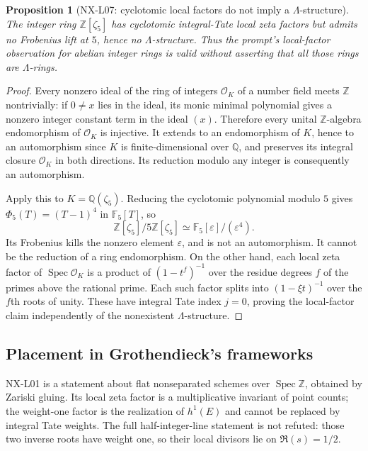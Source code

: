 \documentclass[11pt]{article}
\newtheorem{proposition}[theorem]{Proposition}
\theoremstyle{remark}
\begin{document}
\begin{proposition}[NX-L07: cyclotomic local factors do not imply a $\Lambda$-structure]
\label{NX-L07}
The integer ring $\mathbb Z[\zeta_5]$ has cyclotomic integral-Tate
local zeta factors but admits no Frobenius lift at $5$, hence no
$\Lambda$-structure.  Thus the prompt's local-factor observation for
abelian integer rings is valid without asserting that all those
rings are $\Lambda$-rings.
\end{proposition}

\begin{proof}
Every nonzero ideal of the ring of integers $\mathcal O_K$ of a
number field meets $\mathbb Z$ nontrivially: if $0\ne x$ lies in the
ideal, its monic minimal polynomial gives a nonzero integer constant
term in the ideal $(x)$.  Therefore every unital $\mathbb Z$-algebra
endomorphism of $\mathcal O_K$ is injective.  It extends to an
endomorphism of $K$, hence to an automorphism since $K$ is
finite-dimensional over $\mathbb Q$, and preserves its integral
closure $\mathcal O_K$ in both directions.  Its reduction modulo
any integer is consequently an automorphism.

Apply this to $K=\mathbb Q(\zeta_5)$.  Reducing the cyclotomic
polynomial modulo $5$ gives
$\Phi_5(T)=(T-1)^4$ in $\mathbb F_5[T]$, so
\[
 \mathbb Z[\zeta_5]/5\mathbb Z[\zeta_5]
 \simeq\mathbb F_5[\varepsilon]/(\varepsilon^4).
\]
Its Frobenius kills the nonzero element $\varepsilon$, and is not an
automorphism.  It cannot be the reduction of a ring endomorphism.
On the other hand, each local zeta factor of $\operatorname{Spec}\mathcal O_K$
is a product of $(1-t^f)^{-1}$ over the residue degrees $f$ of the
primes above the rational prime.  Each such factor splits into
$(1-\xi t)^{-1}$ over the $f$th roots of unity.  These have integral
Tate index $j=0$, proving the local-factor claim independently of
the nonexistent $\Lambda$-structure.
\end{proof}

\subsection{Placement in Grothendieck's frameworks}

NX-L01 is a statement about flat nonseparated schemes over
$\operatorname{Spec}\mathbb Z$, obtained by Zariski gluing.  Its
local zeta factor is a multiplicative invariant of point counts;
the weight-one factor is the realization of $h^1(E)$ and cannot be
replaced by integral Tate weights.  The full half-integer-line
statement is not refuted: those two inverse roots have weight one,
so their local divisors lie on $\Re(s)=1/2$.
\end{document}
